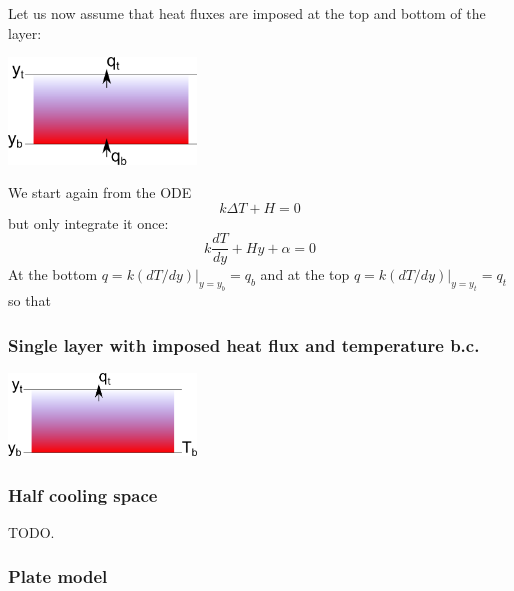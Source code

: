 Let us now assume that heat fluxes are imposed at the top and bottom of the layer:
\begin{center} 
\includegraphics[width=5cm]{images/initial_temperature/tempcond2.png}
\end{center}

We start again from the ODE
\[
k \Delta T + H = 0 
\]
but only integrate it once:
\[
k \frac{dT}{dy}  + H y + \alpha  = 0 
\]
At the bottom $q=k(dT/dy)|_{y=y_b} = q_b$ and at the top
$q=k(dT/dy)|_{y=y_t} = q_t$ so that 



 
\subsubsection{Single layer with imposed heat flux and temperature b.c. }

\begin{center}
\includegraphics[width=5cm]{images/initial_temperature/tempcond3.png}
\end{center}



\subsubsection{Half cooling space}

TODO. 

\Literature \cite{fagm12} 

\subsubsection{Plate model}

\cite{mcke67}

